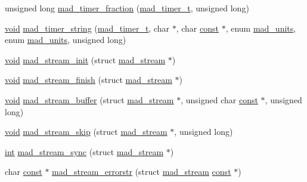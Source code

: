 \begin{DoxyCompactItemize}
\item 
unsigned long \hyperlink{lib-src_2libmad_2msvc_09_09_2mad_8h_af1de1e98b27802f56d48d54f108305e2}{mad\+\_\+timer\+\_\+fraction} (\hyperlink{structmad__timer__t}{mad\+\_\+timer\+\_\+t}, unsigned long)
\item 
\hyperlink{sound_8c_ae35f5844602719cf66324f4de2a658b3}{void} \hyperlink{lib-src_2libmad_2msvc_09_09_2mad_8h_a2c7c6843a26c88347659c9c58c6c5f58}{mad\+\_\+timer\+\_\+string} (\hyperlink{structmad__timer__t}{mad\+\_\+timer\+\_\+t}, char $\ast$, char \hyperlink{getopt1_8c_a2c212835823e3c54a8ab6d95c652660e}{const} $\ast$, enum \hyperlink{lib-src_2libmad_2msvc_09_09_2mad_8h_a8b5cf795da949ab23ac909021d884fff}{mad\+\_\+units}, enum \hyperlink{lib-src_2libmad_2msvc_09_09_2mad_8h_a8b5cf795da949ab23ac909021d884fff}{mad\+\_\+units}, unsigned long)
\item 
\hyperlink{sound_8c_ae35f5844602719cf66324f4de2a658b3}{void} \hyperlink{lib-src_2libmad_2msvc_09_09_2mad_8h_a73f0fd6d3e3eca8d8413d14c021ccf7e}{mad\+\_\+stream\+\_\+init} (struct \hyperlink{structmad__stream}{mad\+\_\+stream} $\ast$)
\item 
\hyperlink{sound_8c_ae35f5844602719cf66324f4de2a658b3}{void} \hyperlink{lib-src_2libmad_2msvc_09_09_2mad_8h_a1a74f838480c1876a542b0f28e102c3c}{mad\+\_\+stream\+\_\+finish} (struct \hyperlink{structmad__stream}{mad\+\_\+stream} $\ast$)
\item 
\hyperlink{sound_8c_ae35f5844602719cf66324f4de2a658b3}{void} \hyperlink{lib-src_2libmad_2msvc_09_09_2mad_8h_ad093dc109695de5cbd7bb50b7f64249e}{mad\+\_\+stream\+\_\+buffer} (struct \hyperlink{structmad__stream}{mad\+\_\+stream} $\ast$, unsigned char \hyperlink{getopt1_8c_a2c212835823e3c54a8ab6d95c652660e}{const} $\ast$, unsigned long)
\item 
\hyperlink{sound_8c_ae35f5844602719cf66324f4de2a658b3}{void} \hyperlink{lib-src_2libmad_2msvc_09_09_2mad_8h_ae71c4bcac81926d21ad7509d11c0e8cc}{mad\+\_\+stream\+\_\+skip} (struct \hyperlink{structmad__stream}{mad\+\_\+stream} $\ast$, unsigned long)
\item 
\hyperlink{xmltok_8h_a5a0d4a5641ce434f1d23533f2b2e6653}{int} \hyperlink{lib-src_2libmad_2msvc_09_09_2mad_8h_a57761cd21ad16f10dde3c0b3e6ad2d95}{mad\+\_\+stream\+\_\+sync} (struct \hyperlink{structmad__stream}{mad\+\_\+stream} $\ast$)
\item 
char \hyperlink{getopt1_8c_a2c212835823e3c54a8ab6d95c652660e}{const} $\ast$ \hyperlink{lib-src_2libmad_2msvc_09_09_2mad_8h_a205370e53b1066e7de4aae43b794ef2e}{mad\+\_\+stream\+\_\+errorstr} (struct \hyperlink{structmad__stream}{mad\+\_\+stream} \hyperlink{getopt1_8c_a2c212835823e3c54a8ab6d95c652660e}{const} $\ast$)

\end{DoxyCompactItemize}
